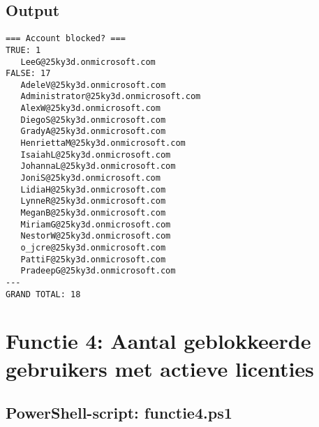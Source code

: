 \subsection{Output}

\begin{scriptsize}
\begin{verbatim}
=== Account blocked? ===
TRUE: 1
   LeeG@25ky3d.onmicrosoft.com
FALSE: 17
   AdeleV@25ky3d.onmicrosoft.com
   Administrator@25ky3d.onmicrosoft.com
   AlexW@25ky3d.onmicrosoft.com
   DiegoS@25ky3d.onmicrosoft.com
   GradyA@25ky3d.onmicrosoft.com
   HenriettaM@25ky3d.onmicrosoft.com
   IsaiahL@25ky3d.onmicrosoft.com
   JohannaL@25ky3d.onmicrosoft.com
   JoniS@25ky3d.onmicrosoft.com
   LidiaH@25ky3d.onmicrosoft.com
   LynneR@25ky3d.onmicrosoft.com
   MeganB@25ky3d.onmicrosoft.com
   MiriamG@25ky3d.onmicrosoft.com
   NestorW@25ky3d.onmicrosoft.com
   o_jcre@25ky3d.onmicrosoft.com
   PattiF@25ky3d.onmicrosoft.com
   PradeepG@25ky3d.onmicrosoft.com
---
GRAND TOTAL: 18
\end{verbatim}
\end{scriptsize}

\clearpage

\section{Functie 4: Aantal geblokkeerde gebruikers met actieve licenties}

\subsection{PowerShell-script: functie4.ps1}

